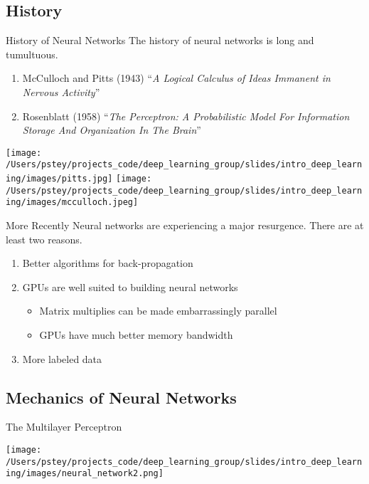 \documentclass[pdf]{beamer}
\begin{document}
\subsection{History}
	\begin{frame}{History of Neural Networks}
	The history of neural networks is long and tumultuous.
	\vspace{2em}
		\begin{enumerate}
			\item McCulloch and Pitts (1943) ``\textit{A Logical Calculus of Ideas Immanent in Nervous Activity}''
			\item Rosenblatt (1958) ``\textit{The Perceptron: A Probabilistic Model For Information Storage And Organization In The Brain}''
		\end{enumerate}
	\begin{center}
		\texttt{[image: /Users/pstey/projects\_code/deep\_learning\_group/slides/intro\_deep\_learning/images/pitts.jpg]}
		\hspace{3em}
		\texttt{[image: /Users/pstey/projects\_code/deep\_learning\_group/slides/intro\_deep\_learning/images/mcculloch.jpeg]}
	\end{center}
	\end{frame}
	
	\begin{frame}{More Recently}
	Neural networks are experiencing a major resurgence. There are at least two reasons.
	
		\begin{enumerate}
			\item Better algorithms for back-propagation
			\item GPUs are well suited to building neural networks
				\begin{itemize}
					\item Matrix multiplies can be made embarrassingly parallel 
					\item GPUs have much better memory bandwidth
				\end{itemize}
			\item More labeled data
		\end{enumerate}
	\end{frame}



\subsection{Mechanics of Neural Networks}
	\begin{frame}{The Multilayer Perceptron}
	\begin{center}
		\texttt{[image: /Users/pstey/projects\_code/deep\_learning\_group/slides/intro\_deep\_learning/images/neural\_network2.png]}
	\end{center}
	\end{frame}
\end{document}
